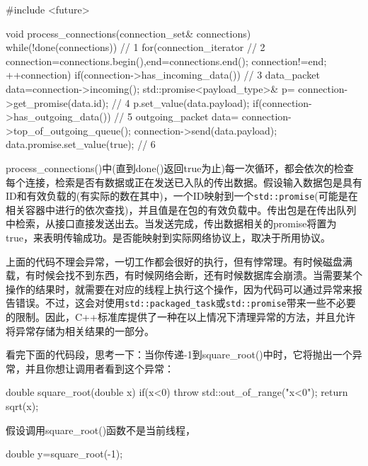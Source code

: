 \begin{cpp}
#include <future>

void process_connections(connection_set& connections)
{
  while(!done(connections))  // 1
  {
    for(connection_iterator  // 2
            connection=connections.begin(),end=connections.end();
          connection!=end;
          ++connection)
    {
      if(connection->has_incoming_data())  // 3
      {
        data_packet data=connection->incoming();
        std::promise<payload_type>& p=
            connection->get_promise(data.id);  // 4
        p.set_value(data.payload);
      }
      if(connection->has_outgoing_data())  // 5
      {
        outgoing_packet data=
            connection->top_of_outgoing_queue();
        connection->send(data.payload);
        data.promise.set_value(true);  // 6
      }
    }
  }
}
\end{cpp}

process\_connections()中(直到done()返回true为止)每一次循环，都会依次的检查每个连接，检索是否有数据或正在发送已入队的传出数据。假设输入数据包是具有ID和有效负载的(有实际的数在其中)，一个ID映射到一个\texttt{std::promise}(可能是在相关容器中进行的依次查找)，并且值是在包的有效负载中。传出包是在传出队列中检索，从接口直接发送出去。当发送完成，传出数据相关的promise将置为true，来表明传输成功。是否能映射到实际网络协议上，取决于所用协议。

上面的代码不理会异常，一切工作都会很好的执行，但有悖常理。有时候磁盘满载，有时候会找不到东西，有时候网络会断，还有时候数据库会崩溃。当需要某个操作的结果时，就需要在对应的线程上执行这个操作，因为代码可以通过异常来报告错误。不过，这会对使用\texttt{std::packaged\_task}或\texttt{std::promise}带来一些不必要的限制。因此，C++标准库提供了一种在以上情况下清理异常的方法，并且允许将异常存储为相关结果的一部分。


看完下面的代码段，思考一下：当你传递-1到square\_root()中时，它将抛出一个异常，并且你想让调用者看到这个异常：

\begin{cpp}
double square_root(double x)
{
  if(x<0)
  {
    throw std::out_of_range("x<0");
  }
  return sqrt(x);
}
\end{cpp}

假设调用square\_root()函数不是当前线程，

\begin{cpp}
double y=square_root(-1);
\end{cpp}

